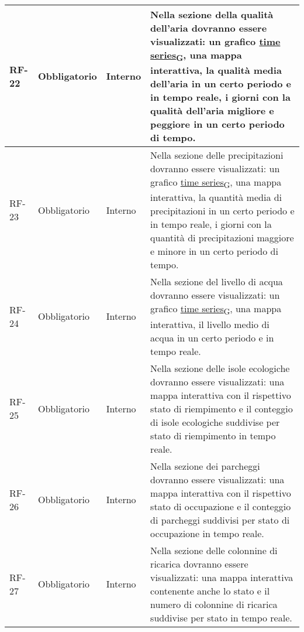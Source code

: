 \begin{longtable}{|>{\centering\arraybackslash}m{}|>{\centering\arraybackslash}m{}|>{\centering\arraybackslash}m{}|>{\centering\arraybackslash}m{}|}
	\\\hline
	RF-22           & Obbligatorio        & Interno                                                                                                           & Nella sezione della qualità dell'aria dovranno essere visualizzati: un grafico \href{https://7last.github.io/docs/rtb/documentazione-interna/glossario\#time-series}{time series\textsubscript{G}}, una mappa interattiva, la qualità media dell'aria in un certo periodo e in tempo reale, i giorni con la qualità dell'aria migliore e peggiore in un certo periodo di tempo.
	\\\hline
	RF-23           & Obbligatorio        & Interno                                                                                                           & Nella sezione delle precipitazioni dovranno essere visualizzati: un grafico \href{https://7last.github.io/docs/rtb/documentazione-interna/glossario\#time-series}{time series\textsubscript{G}}, una mappa interattiva, la quantità media di precipitazioni in un certo periodo e in tempo reale, i giorni con la quantità di precipitazioni maggiore e minore in un certo periodo di tempo.
	\\\hline
	RF-24           & Obbligatorio        & Interno                                                                                                           & Nella sezione del livello di acqua dovranno essere visualizzati: un grafico \href{https://7last.github.io/docs/rtb/documentazione-interna/glossario\#time-series}{time series\textsubscript{G}}, una mappa interattiva, il livello medio di acqua in un certo periodo e in tempo reale.
	\\\hline
	RF-25           & Obbligatorio        & Interno                                                                                                           & Nella sezione delle isole ecologiche dovranno essere visualizzati: una mappa interattiva con il rispettivo stato di riempimento e il conteggio di isole ecologiche suddivise per stato di riempimento in tempo reale.
	\\\hline
	RF-26           & Obbligatorio        & Interno                                                                                                           & Nella sezione dei parcheggi dovranno essere visualizzati: una mappa interattiva con il rispettivo stato di occupazione e il conteggio di parcheggi suddivisi per stato di occupazione in tempo reale.
	\\\hline
	RF-27           & Obbligatorio        & Interno                                                                                                           & Nella sezione delle colonnine di ricarica dovranno essere visualizzati: una mappa interattiva contenente anche lo stato e il numero di colonnine di ricarica suddivise per stato in tempo reale.

\end{longtable}
